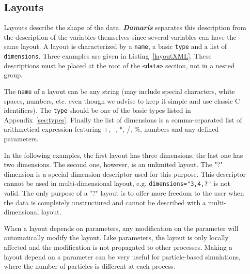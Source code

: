 \documentclass[11pt]{report}
\newcommand{\Damaris}{\emph{\textbf{Damaris}}}
\begin{document}
\noindent\begin{minipage}{\textwidth}
\vspace{0.5cm}

\end{minipage}

\subsection{Layouts}

Layouts describe the shape of the data. \Damaris{} separates this description from the description
of the variables themselves since several variables can have the same layout.
A layout is characterized by a \texttt{name}, a basic \texttt{type} and a list of \texttt{dimensions}.
Three examples are given in Listing~\ref{layoutXML}. These descriptions
must be placed at the root of the \texttt{<data>} section, not in a nested group.

The \texttt{name} of a layout can be any string (may include special characters, white spaces, numbers, etc. even
though we advise to keep it simple and use classic C identifiers).
The \texttt{type} should be one of the basic types listed in Appendix~\ref{sec:types}.
Finally the list of dimensions is a comma-separated list of arithmetical expression featuring
+, -, *, /, \%, numbers and any defined parameters.

In the following examples, the first layout has three dimensions, the last one has two dimensions.
The second one, however, is an unlimited layout. The "?" dimension is a special dimension descriptor
used for this purpose. This descriptor cannot be used in multi-dimensional layout, e.g. \texttt{dimensions="3,4,?"}
is not valid. The only purpose of a "?" layout is to offer more freedom to the user when the data is completely
unstructured and cannot be described with a multi-dimensional layout.

When a layout depends on parameters, any modification on the parameter will automatically modify
the layout. Like parameters, the layout is only locally affected and the modification is not propagated to
other processes. Making a layout depend on a parameter can be very useful for particle-based simulations,
where the number of particles is different at each process.

\noindent\begin{minipage}{\textwidth}
\vspace{0.5cm}

\end{minipage}
\end{document}
